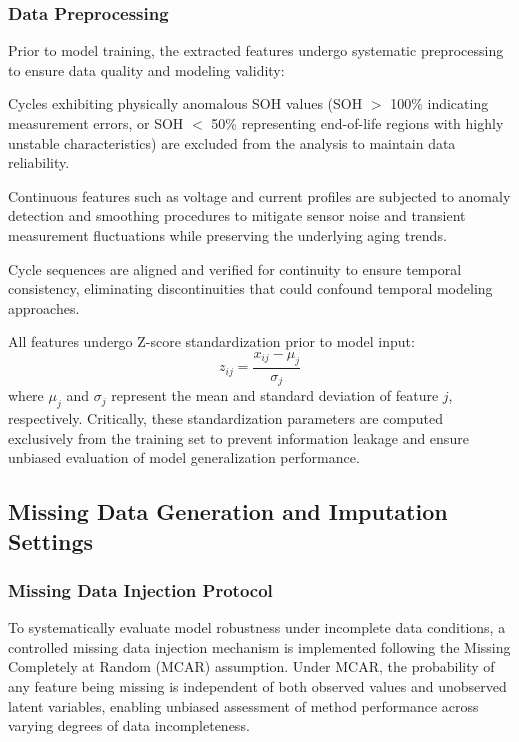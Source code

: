 \documentclass[5p,times]{elsarticle}
\begin{document}
\subsubsection{Data Preprocessing}

Prior to model training, the extracted features undergo systematic preprocessing to ensure data quality and modeling validity:

Cycles exhibiting physically anomalous SOH values (SOH $>$ 100\% indicating measurement errors, or SOH $<$ 50\% representing end-of-life regions with highly unstable characteristics) are excluded from the analysis to maintain data reliability.

Continuous features such as voltage and current profiles are subjected to anomaly detection and smoothing procedures to mitigate sensor noise and transient measurement fluctuations while preserving the underlying aging trends.

Cycle sequences are aligned and verified for continuity to ensure temporal consistency, eliminating discontinuities that could confound temporal modeling approaches.

All features undergo Z-score standardization prior to model input:
\begin{equation}
    z_{ij} = \frac{x_{ij} - \mu_j}{\sigma_j}
\end{equation}
where $\mu_j$ and $\sigma_j$ represent the mean and standard deviation of feature $j$, respectively. Critically, these standardization parameters are computed exclusively from the training set to prevent information leakage and ensure unbiased evaluation of model generalization performance.

\subsection{Missing Data Generation and Imputation Settings}\label{sec:missing}

\subsubsection{Missing Data Injection Protocol}

To systematically evaluate model robustness under incomplete data conditions, a controlled missing data injection mechanism is implemented following the Missing Completely at Random (MCAR) assumption. Under MCAR, the probability of any feature being missing is independent of both observed values and unobserved latent variables, enabling unbiased assessment of method performance across varying degrees of data incompleteness.
\end{document}
